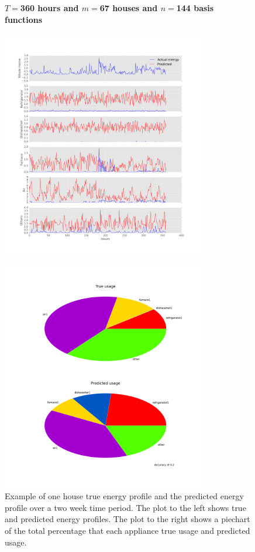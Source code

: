 \begin{figure}[H]
	\centering
	\textbf{$T=$360 hours and $m=$67 houses and $n=$144 basis functions}\par\medskip
	\begin{minipage}{.65\textwidth}
		\centering
		\includegraphics[width=\textwidth,height=10cm]{./figures/results/normal_appliances_144_360}
		\label{fig:test8}
	\end{minipage}%
	\begin{minipage}{.4\textwidth}
		\centering
		\includegraphics[width=\textwidth,height=10cm]{./figures/results/normal_pie_chart_144_360}
	\end{minipage}
	\caption{Example of one house true energy profile and the predicted energy profile over a two week time period. The plot to the left shows true and predicted energy profiles. The plot to the right shows a piechart of the total percentage that each appliance true usage and predicted usage.}
	\label{fig:normal_360}
\end{figure}

